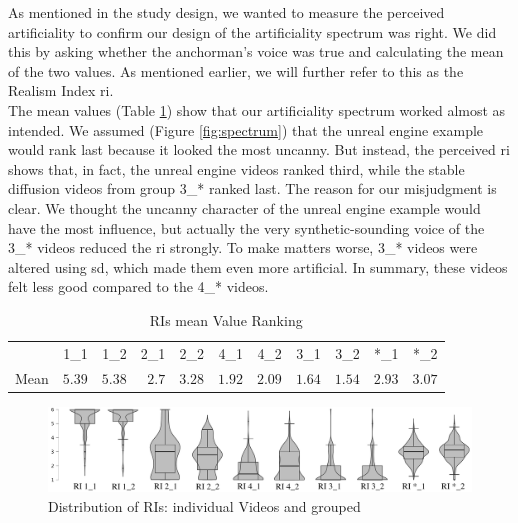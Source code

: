 \documentclass[
  a4paper,  %
  twoside,  %
  bibliography=totoc,
  headsepline,
  cleardoublepage=empty,
  parskip=half,
  draft=false
]{scrbook}
\begin{document}
As mentioned in the study design, we wanted to measure the perceived artificiality to confirm our design of the artificiality spectrum was right. We did this by asking whether the anchorman's voice was true and calculating the mean of the two values. As mentioned earlier, we will further refer to this as the Realism Index \gls{ri}. \\
The mean values (Table \ref{tab:RIs-mean}) show that our artificiality spectrum worked almost as intended. We assumed (Figure \ref{fig:spectrum}) that the unreal engine example would rank last because it looked the most uncanny. But instead, the perceived \gls{ri} shows that, in fact, the unreal engine videos ranked third, while the stable diffusion videos from group 3\_* ranked last. The reason for our misjudgment is clear. We thought the uncanny character of the unreal engine example would have the most influence, but actually the very synthetic-sounding voice of the 3\_* videos reduced the \gls{ri} strongly. To make matters worse, 3\_* videos were altered using \gls{sd}, which made them even more artificial. In summary, these videos felt less good compared to the 4\_* videos.

\begin{table}[h]
	\centering
	\caption{RIs mean Value Ranking}
	\label{tab:RIs-mean}
	{
		\begin{tabular}{lrrrrrrrrrr}
			\toprule
			 & 1\_1 & 1\_2 & 2\_1 & 2\_2 & 4\_1 & 4\_2 & 3\_1 & 3\_2 & *\_1 & *\_2 \\
			\cmidrule[0.4pt]{1-11}
			Mean & $5.39$ & $5.38$ & $2.7$ & $3.28$ & $1.92$ & $2.09$ & $1.64$ & $1.54$  & $2.93$ & $3.07$\\
			\bottomrule
		\end{tabular}
	}
\end{table}
\begin{figure}[h]
  \includegraphics[width=1\textwidth]{graphics/statistics/RIs/RI_compilation.png}
  \caption{Distribution of RIs: individual Videos and grouped}
  \label{fig:all-RIs}
\end{figure}
\end{document}
